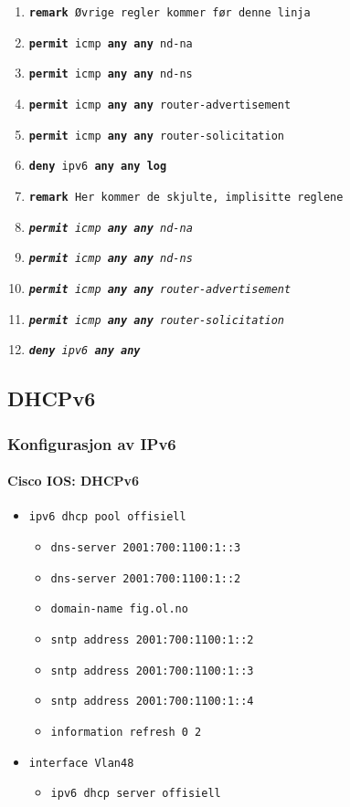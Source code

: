 \begin{frame}[allowframebreaks]
\begin{itemize}
\begin{enumerate}
    \item \texttt{\textbf{remark} Øvrige regler kommer før denne linja}
    \item \texttt{\textbf{permit} icmp \textbf{any any} nd-na}
    \item \texttt{\textbf{permit} icmp \textbf{any any} nd-ns}
    \item \texttt{\textbf{permit} icmp \textbf{any any} router-advertisement}
    \item \texttt{\textbf{permit} icmp \textbf{any any} router-solicitation}
    \item \texttt{\textbf{deny\phantom{it}} ipv6 \textbf{any any \alert{log}}}
    \item \texttt{\textbf{remark} Her kommer de skjulte, implisitte reglene}
    \item \texttt{\textit{\textbf{permit} icmp \textbf{any} \textbf{any} nd-na}}
    \item \texttt{\textit{\textbf{permit} icmp \textbf{any} \textbf{any} nd-ns}}
    \item \texttt{\textit{\textbf{permit} icmp \textbf{any} \textbf{any} router-advertisement}}
    \item \texttt{\textit{\textbf{permit} icmp \textbf{any} \textbf{any} router-solicitation}}
    \item \texttt{\textit{\textbf{deny\phantom{it}} ipv6 \textbf{any} \textbf{any}}}
    \end{enumerate}
  \end{itemize}
\end{frame}

\subsection{DHCPv6}
\begin{frame}%
  \frametitle{Konfigurasjon av IPv6}
  \framesubtitle{Cisco IOS: DHCPv6}
  \pause
  \begin{itemize}[<+->]
  \item \texttt{ipv6 dhcp pool offisiell}
    \begin{itemize}[<+->]
    \item \texttt{dns-server 2001:700:1100:1::3}
    \item \texttt{dns-server 2001:700:1100:1::2}
    \item \texttt{domain-name fig.ol.no}
    \item \texttt{sntp address 2001:700:1100:1::2}
    \item \texttt{sntp address 2001:700:1100:1::3}
    \item \texttt{sntp address 2001:700:1100:1::4}
    \item \texttt{information refresh 0 2}
    \end{itemize}
  \item \texttt{interface Vlan48}
    \begin{itemize}[<+->]
    \item \texttt{ipv6 dhcp server offisiell}
    \end{itemize}
  \end{itemize}
\end{frame}

